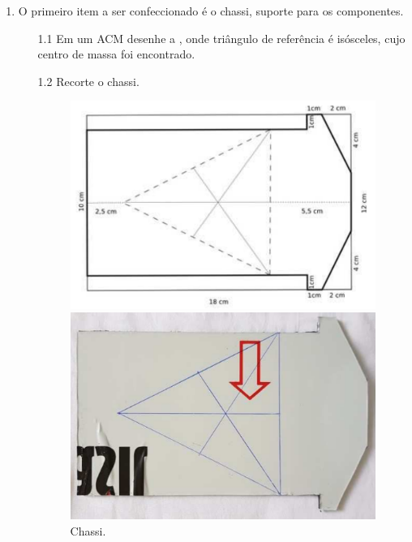 \documentclass{textolivre-html}
\begin{document}
\begin{enumerate}
\item O primeiro item a ser confeccionado é o chassi, suporte para os componentes.
    \begin{enumerate}
    \item[1.1] Em um ACM desenhe a , onde triângulo de referência é isósceles, cujo centro de massa foi encontrado.
    \item[1.2] Recorte o chassi.

    \begin{figure}[h!]
    \begin{minipage}{0.47\textwidth}
    \includegraphics[width=\linewidth]{figure-01.pdf}
    \subcaption{}
    \end{minipage}
    \hfill
    \begin{minipage}{0.47\textwidth}
    \includegraphics[width=\linewidth]{figure-02.pdf}
    \subcaption{}
    \end{minipage}
    \caption{Chassi.}
    \label{fig01}
    \end{figure}


\end{enumerate}
\end{enumerate}
\end{document}
